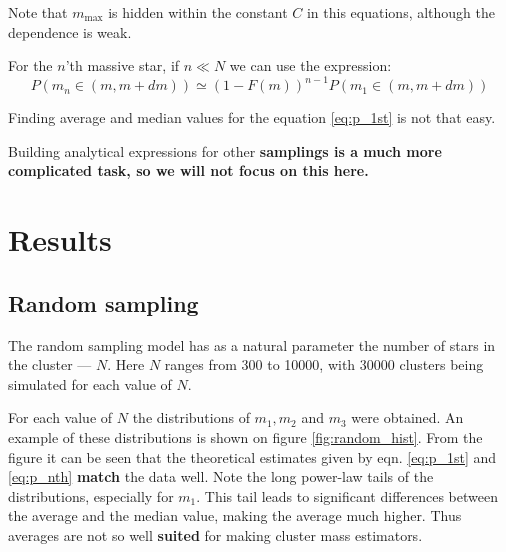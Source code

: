 \documentclass{aastex}
\newcommand{\Mmax}{m_{\mathrm{max}}}
\begin{document}
Note that $\Mmax$ is hidden within the constant $C$ in this equations, although the dependence is weak.

For the $n$'th massive star, if $n \ll N$ we can use the expression:
\begin{equation}\label{eq:p_nth}
 P(m_n \in (m, m+dm)) \simeq \left( 1 - F(m) \right)^{n-1} P(m_1 \in (m, m+dm))
\end{equation} 

Finding average and median values for the equation \ref{eq:p_1st} is not that easy.

Building analytical expressions for other\textbf{ samplings is a much more complicated task, so we will not focus on this here.}

\section{Results}
\subsection{Random sampling}\label{sec:random}
The random sampling model has as a natural parameter the number of stars in the cluster --- $N$. Here $N$ ranges from 300 to 10000, with 30000 clusters being simulated for each value of $N$.

For each value of $N$ the distributions of $m_1, m_2$ and $m_3$ were obtained. An example of these distributions is shown on figure \ref{fig:random_hist}. From the figure it can be seen that the theoretical estimates given by eqn. \ref{eq:p_1st} and \ref{eq:p_nth} \textbf{match} the data well.
Note the long power-law tails of the distributions, especially for $m_1$. This tail leads to significant differences between the average and the median value, making the average much higher. Thus averages are not so well \textbf{suited} for making cluster mass estimators.
\end{document}
